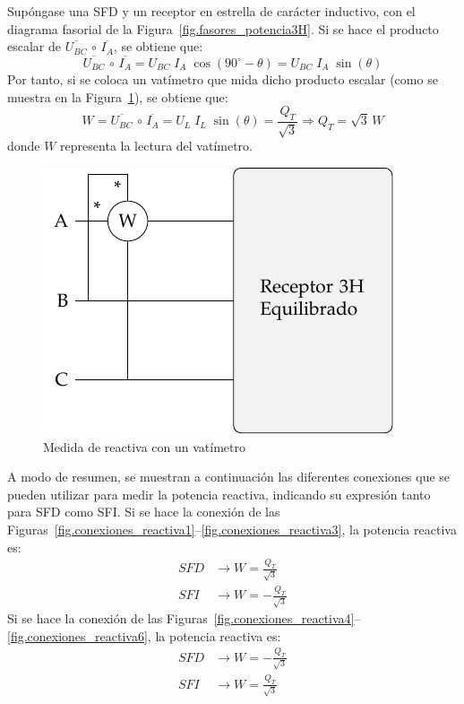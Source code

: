 \documentclass[11pt]{book} %
\begin{document}
Supóngase una SFD y un receptor en estrella de carácter inductivo, con el diagrama fasorial de la Figura~\ref{fig.fasores_potencia3H}. Si se hace el producto escalar de $\overline{U_{BC}}\,\circ\,\overline{I_A}$, se obtiene que:
\begin{equation*}
    \overline{U_{BC}}\,\circ\,\overline{I_A}=U_{BC}\;I_A\;\cos(90^\circ-\theta)=U_{BC}\;I_A\;\sin(\theta)
\end{equation*}
Por tanto, si se coloca un vatímetro que mida dicho producto escalar (como se muestra en la Figura~\ref{fig.Reactiva3H_A-BC}), se obtiene que: 
\begin{equation}
    W=\overline{U_{BC}}\,\circ\,\overline{I_A}=U_{L}\;I_L\;\sin(\theta)=\dfrac{Q_T}{\sqrt{3}}\Rightarrow \boxed{Q_T=\sqrt{3}\,W}
\end{equation}
donde $W$ representa la lectura del vatímetro. 
\begin{figure}[htbp]
    \centering
    \includegraphics{../figs/Reactiva3H_A-BC.pdf}
    \caption{Medida de reactiva con un vatímetro}
    \label{fig.Reactiva3H_A-BC}
\end{figure}

A modo de resumen, se muestran a continuación las diferentes conexiones que se pueden utilizar para medir la potencia reactiva, indicando su expresión tanto para SFD como SFI. Si se hace la conexión de las Figuras~\ref{fig.conexiones_reactiva1}--\ref{fig.conexiones_reactiva3}, la potencia reactiva es:
\begin{align}
SFD &\rightarrow \boxed{W = \frac{Q_T}{\sqrt{3}}}\\
SFI &\rightarrow \boxed{W =  - \frac{Q_T}{\sqrt{3}}}
\end{align}
Si se hace la conexión de las Figuras~\ref{fig.conexiones_reactiva4}--\ref{fig.conexiones_reactiva6}, la potencia reactiva es:
\begin{align}
SFD &\rightarrow \boxed{W = - \frac{Q_T}{\sqrt{3}}}\\
SFI &\rightarrow \boxed{W = \frac{Q_T}{\sqrt{3}}}
\end{align}
\end{document}
